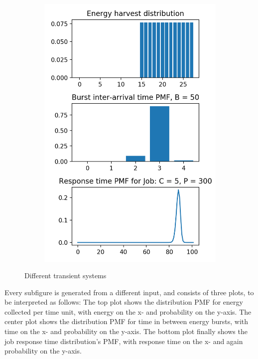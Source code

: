 \documentclass[a4paper,oneside]{csthesis}
\begin{document}
\begin{figure}[ht]
\begin{subfigure}[b]{0.45\textwidth}
        \includegraphics[width=\textwidth]{figures/energy4.png}
    \end{subfigure}
    \caption{Different transient systems}
    \label{fig:energy}
\end{figure}

Every subfigure is generated from a different input, and consists of three plots, to be interpreted as follows: The top plot shows the distribution PMF for energy collected per time unit, with energy on the x- and probability on the y-axis. The center plot shows the distribution PMF for time in between energy bursts, with time on the x- and probability on the y-axis. The bottom plot finally shows the job response time distribution's PMF, with response time on the x- and again probability on the y-axis.
\end{document}
